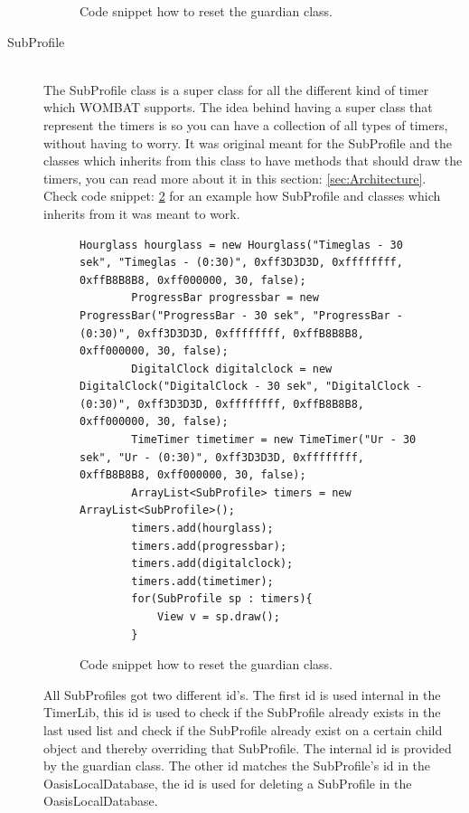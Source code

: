 \begin{description}
\begin{figure}[H]
\begin{lstlisting}
\end{lstlisting}
\caption{Code snippet how to reset the guardian class.}%
\label{code:TimerLibLocks}%
\end{figure}

  \item[SubProfile] \hfill \\
  The SubProfile class is a super class for all the different kind of timer which WOMBAT supports. The idea behind having a super class that represent the timers is so you can have a collection of all types of timers, without having to worry. It was original meant for the SubProfile and the classes which inherits from this class to have methods that should draw the timers, you can read more about it in this section: \ref{sec:Architecture}. Check code snippet: \ref{code:subprofileexample} for an example how SubProfile and classes which inherits from it was meant to work.
	
\begin{figure}[H]
\begin{lstlisting}
Hourglass hourglass = new Hourglass("Timeglas - 30 sek", "Timeglas - (0:30)", 0xff3D3D3D, 0xffffffff, 0xffB8B8B8, 0xff000000, 30, false);
		ProgressBar progressbar = new ProgressBar("ProgressBar - 30 sek", "ProgressBar - (0:30)", 0xff3D3D3D, 0xffffffff, 0xffB8B8B8, 0xff000000, 30, false);
		DigitalClock digitalclock = new DigitalClock("DigitalClock - 30 sek", "DigitalClock - (0:30)", 0xff3D3D3D, 0xffffffff, 0xffB8B8B8, 0xff000000, 30, false);
		TimeTimer timetimer = new TimeTimer("Ur - 30 sek", "Ur - (0:30)", 0xff3D3D3D, 0xffffffff, 0xffB8B8B8, 0xff000000, 30, false);
		ArrayList<SubProfile> timers = new ArrayList<SubProfile>();
		timers.add(hourglass);
		timers.add(progressbar);
		timers.add(digitalclock);
		timers.add(timetimer);
		for(SubProfile sp : timers){
			View v = sp.draw();
		}
\end{lstlisting}
\caption{Code snippet how to reset the guardian class.}%
\label{code:subprofileexample}%
\end{figure}
	
	All SubProfiles got two different id's. The first id is used internal in the TimerLib, this id is used to check if the SubProfile already exists in the last used list and check if the SubProfile already exist on a certain child object and thereby overriding that SubProfile. The internal id is provided by the guardian class. The other id matches the SubProfile's id in the OasisLocalDatabase, the id is used for deleting a SubProfile in the OasisLocalDatabase.
	

\end{description}
